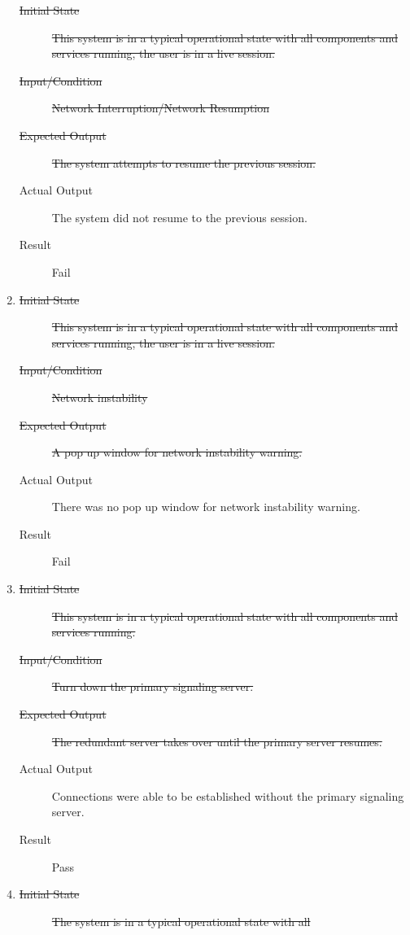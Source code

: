 \documentclass[12pt, titlepage]{article}
\begin{document}
\begin{enumerate}[NFR-T1]
\begin{description}
    \item[\sout{Initial State}]\sout{ This system is in a typical operational state with all
      components and services running, the user is in a live session.
    }\item[\sout{Input/Condition}]\sout{ Network Interruption/Network Resumption
    }\item[\sout{Expected Output}]\sout{ The system attempts to resume the previous session.
    }\item[Actual Output] The system did not resume to the previous session.
    \item[Result] Fail
    \end{description}
  \item \label{NFRT8}
    \begin{description}
    \item[\sout{Initial State}]\sout{ This system is in a typical operational state with all
      components and services running, the user is in a live session.
    }\item[\sout{Input/Condition}]\sout{ Network instability
    }\item[\sout{Expected Output}]\sout{ A pop up window for network instability warning.
    }\item[Actual Output] There was no pop up window for network instability
      warning.
    \item[Result] Fail
    \end{description}
  \item \label{NFRT9}
    \begin{description}
    \item[\sout{Initial State}]\sout{ This system is in a typical operational state with all
      components and services running.
    }\item[\sout{Input/Condition}]\sout{ Turn down the primary signaling server.
    }\item[\sout{Expected Output}]\sout{ The redundant server takes over until the primary server
      resumes.
    }\item[Actual Output] Connections were able to be established without the
      primary signaling server.
    \item[Result] Pass
    \end{description}
  \item \label{NFRT10}
    \begin{description}
    \item[\sout{Initial State}]\sout{ The system is in a typical operational state with all
}
\end{description}
\end{enumerate}
\end{document}
